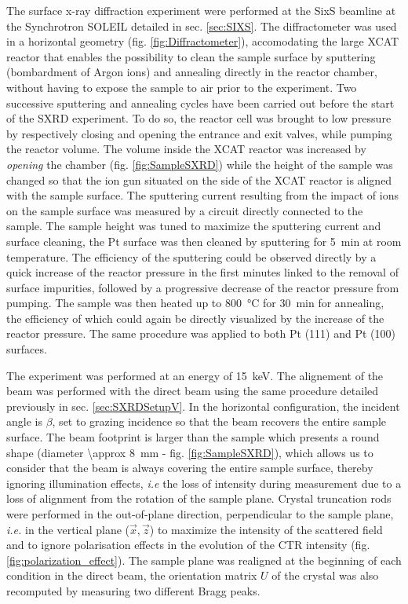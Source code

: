 The surface x-ray diffraction experiment were performed at the SixS beamline at the Synchrotron SOLEIL detailed in sec. \ref{sec:SIXS}.
The diffractometer was used in a horizontal geometry (fig. \ref{fig:Diffractometer}), accomodating the large XCAT reactor that enables the possibility to clean the sample surface by sputtering (bombardment of Argon ions) and annealing directly in the reactor chamber, without having to expose the sample to air prior to the experiment.
Two successive sputtering and annealing cycles have been carried out before the start of the SXRD experiment.
To do so, the reactor cell was brought to low pressure by respectively closing and opening the entrance and exit valves, while pumping the reactor volume.
The volume inside the XCAT reactor was increased by \textit{opening} the chamber (fig. \ref{fig:SampleSXRD}) while the height of the sample was changed so that the ion gun situated on the side of the XCAT reactor is aligned with the sample surface.
The sputtering current resulting from the impact of ions on the sample surface was measured by a circuit directly connected to the sample.
The sample height was tuned to maximize the sputtering current and surface cleaning, the Pt surface was then cleaned by sputtering for \qty{5}{\minute} at room temperature.
The efficiency of the sputtering could be observed directly by a quick increase of the reactor pressure in the first minutes linked to the removal of surface impurities, followed by a progressive decrease of the reactor pressure from pumping.
The sample was then heated up to \qty{800}{\degreeCelsius} for \qty{30}{\minute} for annealing, the efficiency of which could again be directly visualized by the increase of the reactor pressure.
The same procedure was applied to both Pt (111) and Pt (100) surfaces.

The experiment was performed at an energy of \qty{15}{\keV}.
The alignement of the beam was performed with the direct beam using the same procedure detailed previously in sec. \ref{sec:SXRDSetupV}.
In the horizontal configuration, the incident angle is $\beta$, set to grazing incidence so that the beam recovers the entire sample surface.
The beam footprint is larger than the sample which presents a round shape (diameter \qty{\approx 8}{\mm} - fig. \ref{fig:SampleSXRD}), which allows us to consider that the beam is always covering the entire sample surface, thereby ignoring illumination effects, \textit{i.e} the loss of intensity during measurement due to a loss of alignment from the rotation of the sample plane.
Crystal truncation rods were performed in the out-of-plane direction, perpendicular to the sample plane, \textit{i.e.} in the vertical plane ($\vec{x}, \vec{z}$) to maximize the intensity of the scattered field and to ignore polarisation effects in the evolution of the CTR intensity (fig. \ref{fig:polarization_effect}).
The sample plane was realigned at the beginning of each condition in the direct beam, the orientation matrix $U$ of the crystal \parencite{Schleputz2011} was also recomputed by measuring two different Bragg peaks.

